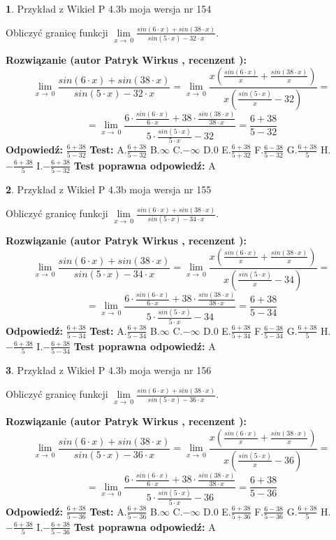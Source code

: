 \documentclass[12pt, a4paper]{article}
\theoremstyle{definition} %
\newtheorem{zad}{}
\newcommand{\zadStart}[1]{\begin{zad}#1\newline}
\newcommand{\zadStop}{\end{zad}}
\newcommand{\rozwStart}[2]{\noindent \textbf{Rozwiązanie (autor #1 , recenzent #2): }\newline}
\newcommand{\rozwStop}{\newline}
\newcommand{\odpStart}{\noindent \textbf{Odpowiedź:}\newline}
\newcommand{\odpStop}{\newline}
\newcommand{\testStart}{\noindent \textbf{Test:}\newline}
\newcommand{\testStop}{\newline}
\newcommand{\kluczStart}{\noindent \textbf{Test poprawna odpowiedź:}\newline}
\newcommand{\kluczStop}{\newline}
\begin{document}
\zadStart{Przykład z Wikieł P 4.3b moja wersja nr 154}


Obliczyć granicę funkcji $\lim\limits_{x\to\ 0}\frac{sin(6 \cdot x)+sin(38 \cdot x)}{sin(5 \cdot x)-32 \cdot x}$.
\zadStop
\rozwStart{Patryk Wirkus}{}
$$\lim\limits_{x\to\ 0}\frac{sin(6 \cdot x)+sin(38 \cdot x)}{sin(5 \cdot x)-32 \cdot x}=\lim\limits_{x\to\ 0}\frac{x(\frac{sin(6 \cdot x)}{x}+\frac{sin(38 \cdot x)}{x})}{x(\frac{sin(5 \cdot x)}{x}-32)}=$$
$$=\lim\limits_{x\to\ 0}\frac{6 \cdot \frac{sin(6 \cdot x)}{6 \cdot x}+38 \cdot \frac{sin(38 \cdot x)}{38 \cdot x}}{5 \cdot \frac{sin(5 \cdot x)}{5 \cdot x}-32}=\frac{6+38}{5-32}$$
\rozwStop
\odpStart
$\frac{6+38}{5-32}$
\odpStop
\testStart
A.$\frac{6+38}{5-32}$
B.$\infty$
C.$-\infty$
D.$0$
E.$\frac{6+38}{5+32}$
F.$\frac{6-38}{5-32}$
G.$\frac{6+38}{5}$
H.$-\frac{6+38}{5}$
I.$-\frac{6+38}{5-32}$
\testStop
\kluczStart
A
\kluczStop



\zadStart{Przykład z Wikieł P 4.3b moja wersja nr 155}


Obliczyć granicę funkcji $\lim\limits_{x\to\ 0}\frac{sin(6 \cdot x)+sin(38 \cdot x)}{sin(5 \cdot x)-34 \cdot x}$.
\zadStop
\rozwStart{Patryk Wirkus}{}
$$\lim\limits_{x\to\ 0}\frac{sin(6 \cdot x)+sin(38 \cdot x)}{sin(5 \cdot x)-34 \cdot x}=\lim\limits_{x\to\ 0}\frac{x(\frac{sin(6 \cdot x)}{x}+\frac{sin(38 \cdot x)}{x})}{x(\frac{sin(5 \cdot x)}{x}-34)}=$$
$$=\lim\limits_{x\to\ 0}\frac{6 \cdot \frac{sin(6 \cdot x)}{6 \cdot x}+38 \cdot \frac{sin(38 \cdot x)}{38 \cdot x}}{5 \cdot \frac{sin(5 \cdot x)}{5 \cdot x}-34}=\frac{6+38}{5-34}$$
\rozwStop
\odpStart
$\frac{6+38}{5-34}$
\odpStop
\testStart
A.$\frac{6+38}{5-34}$
B.$\infty$
C.$-\infty$
D.$0$
E.$\frac{6+38}{5+34}$
F.$\frac{6-38}{5-34}$
G.$\frac{6+38}{5}$
H.$-\frac{6+38}{5}$
I.$-\frac{6+38}{5-34}$
\testStop
\kluczStart
A
\kluczStop



\zadStart{Przykład z Wikieł P 4.3b moja wersja nr 156}


Obliczyć granicę funkcji $\lim\limits_{x\to\ 0}\frac{sin(6 \cdot x)+sin(38 \cdot x)}{sin(5 \cdot x)-36 \cdot x}$.
\zadStop
\rozwStart{Patryk Wirkus}{}
$$\lim\limits_{x\to\ 0}\frac{sin(6 \cdot x)+sin(38 \cdot x)}{sin(5 \cdot x)-36 \cdot x}=\lim\limits_{x\to\ 0}\frac{x(\frac{sin(6 \cdot x)}{x}+\frac{sin(38 \cdot x)}{x})}{x(\frac{sin(5 \cdot x)}{x}-36)}=$$
$$=\lim\limits_{x\to\ 0}\frac{6 \cdot \frac{sin(6 \cdot x)}{6 \cdot x}+38 \cdot \frac{sin(38 \cdot x)}{38 \cdot x}}{5 \cdot \frac{sin(5 \cdot x)}{5 \cdot x}-36}=\frac{6+38}{5-36}$$
\rozwStop
\odpStart
$\frac{6+38}{5-36}$
\odpStop
\testStart
A.$\frac{6+38}{5-36}$
B.$\infty$
C.$-\infty$
D.$0$
E.$\frac{6+38}{5+36}$
F.$\frac{6-38}{5-36}$
G.$\frac{6+38}{5}$
H.$-\frac{6+38}{5}$
I.$-\frac{6+38}{5-36}$
\testStop
\kluczStart
A
\kluczStop
\end{document}
